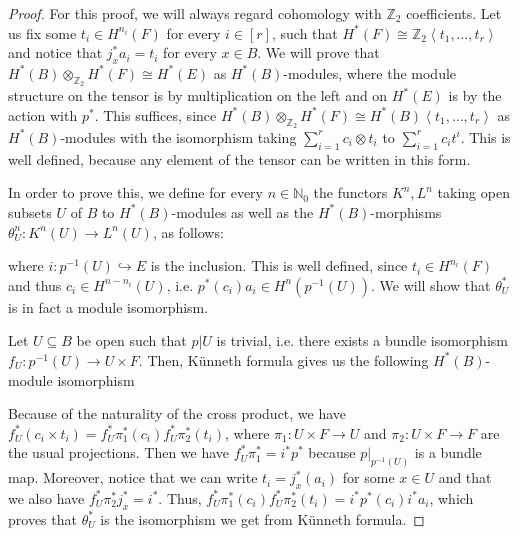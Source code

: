 \begin{proof} For this proof, we will always regard cohomology with $\mathbb{Z}_2$ coefficients. Let us fix some $t_i\in H^{n_i}(F)$ for every $i\in[r]$, such that $H^*(F)\cong\mathbb{Z}_2\left<t_1,\ldots,t_r\right>$ and notice that $j_x^*a_i=t_i$ for every $x\in B$. We will prove that $H^*(B)\otimes_{\mathbb{Z}_2}H^*(F)\cong H^*(E)$ as $H^*(B)$-modules, where the module structure on the tensor is by multiplication on the left and on $H^*(E)$ is by the action with $p^*$. This suffices, since $H^*(B)\otimes_{\mathbb{Z}_2}H^*(F)\cong H^*(B)\left<t_1,\ldots,t_r\right>$ as $H^*(B)$-modules with the isomorphism taking $\sum_{i=1}^rc_i\otimes t_i$ to $\sum_{i=1}^rc_it^i$. This is well defined, because any element of the tensor can be written in this form.

In order to prove this, we define for every $n\in\mathbb{N}_0$ the functors $K^n,L^n$ taking open subsets $U$ of $B$ to $H^*(B)$-modules as well as the $H^*(B)$-morphisms $\theta_U^n:K^n(U)\to L^n(U)$, as follows:
\begin{center}
\end{center}
where $i:p^{-1}(U)\hookrightarrow E$ is the inclusion. This is well defined, since $t_i\in H^{n_i}(F)$ and thus $c_i\in H^{n-n_i}(U)$, i.e. $p^*(c_i)a_i\in H^n(p^{-1}(U))$. We will show that $\theta^*_U$ is in fact a module isomorphism.

Let $U\subseteq B$ be open such that $p|U$ is trivial, i.e. there exists a bundle isomorphism $f_U:p^{-1}(U)\to U\times F$. Then, K\"unneth formula gives us the following $H^*(B)$-module isomorphism
\begin{center}
\end{center}
Because of the naturality of the cross product, we have $f^*_U(c_i\times t_i)=f^*_U\pi_1^*(c_i)f^*_U\pi_2^*(t_i)$, where $\pi_1:U\times F\to U$ and $\pi_2:U\times F\to F$ are the usual projections. Then we have $f_U^*\pi_1^*=i^*p^*$ because $p|_{p^{-1}(U)}$ is a bundle map. Moreover, notice that we can write $t_i=j_x^*(a_i)$ for some $x\in U$ and that we also have $f_U^*\pi_2^*j_x^*=i^*$. Thus, $f^*_U\pi_1^*(c_i)f^*_U\pi_2^*(t_i)=i^*p^*(c_i)i^*a_i$, which proves that $\theta_U^*$ is the isomorphism we get from K\"unneth formula.


\end{proof}
